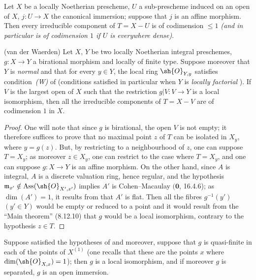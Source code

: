 \begin{corollary}[21.12.11]
\label{IV.21.12.11}
Let $X$ be a locally Noetherian prescheme, $U$ a sub-prescheme induced on an open of $X$, $j:U\to X$ the canonical immersion;
suppose that $j$ is an affine morphism.
Then every irreducible component of $T=X-U$ is of codimension $\leq 1$ \emph{(and in particular is of codimension $1$ if $U$ is everywhere dense)}.
\end{corollary}


\begin{theorem}[21.12.12]
\label{IV.21.12.12}
\textnormal{(van der Waerden)}
Let $X$, $Y$ be two locally Noetherian integral preschemes, $g:X\to Y$ a birational morphism and locally of finite type.
Suppose moreover that $Y$ is \emph{normal} and that for every $y\in Y$, the local ring $\sh{O}_{Y,y}$ satisfies condition~\emph{(W)} of  (conditions satisfied in particular when $Y$ is \emph{locally factorial} ).
If $V$ is the largest open of $X$ such that the restriction $g|V:V\to Y$ is a local isomorphism, then all the irreducible components of $T=X-V$ are of codimension $1$ in $X$.
\end{theorem}

\begin{proof}
One will note that since $g$ is birational, the open $V$ is not empty;
it therefore suffices to prove that no maximal point $z$ of $T$ can be isolated in $X_y$, where $y=g(z)$.
But, by restricting to a neighbourhood of $z$, one can suppose $T=X_y$;
as moreover $z\in X_y$, one can restrict to the case where $T=X_y$, and one can suppose $g:X\to Y$ is an affine morphism.
On the other hand, since $A$ is integral, $A$ is a discrete valuation ring, hence regular, and the hypothesis $\mathfrak{m}_{x'}\notin\operatorname{Ass}(\sh{O}_{X',x'})$ implies $A'$ is Cohen--Macaulay $(\mathbf{0}$, 16.4.6);
as $\dim(A')=1$, it results from  that $A'$ is flat.
Then all the fibres $g^{-1}(y')$ $(y'\in Y)$ would be empty or reduced to a point and it would result from the ``Main theorem'' (8.12.10) that $g$ would be a local isomorphism, contrary to the hypothesis $z\in T$.
\end{proof}

\begin{corollary}[21.12.13]
\label{IV.21.12.13}
Suppose satisfied the hypotheses of  and moreover, suppose that $g$ is quasi-finite in each of the points of $X^{(1)}$ (one recalls that these are the points $x$ where $\dim(\sh{O}_{X,x})=1$);
then $g$ is a local isomorphism, and if moreover $g$ is separated, $g$ is an open immersion.
\end{corollary}

